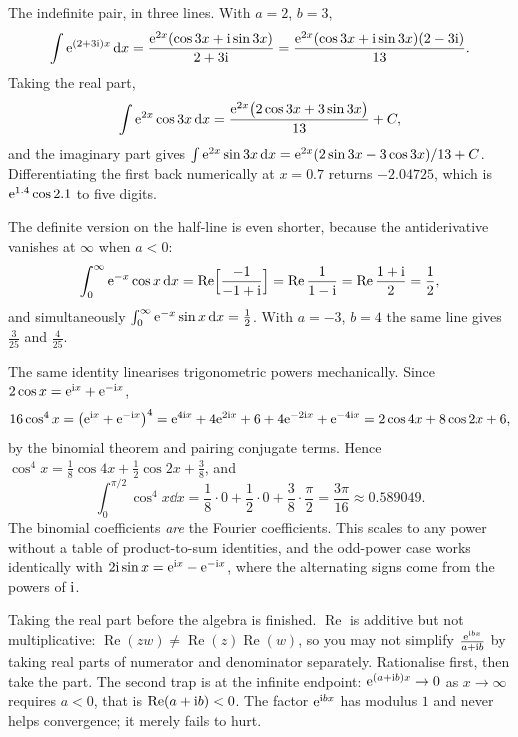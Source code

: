 \begin{worked}
The indefinite pair, in three lines. With $a=2$, $b=3$,
\[\int\mathrm{e}^{(2+3\mathrm{i})x}\,\mathrm{d} x=\frac{\mathrm{e}^{2x}(\cos3x+\mathrm{i}\sin3x)}{2+3\mathrm{i}}=\frac{\mathrm{e}^{2x}(\cos3x+\mathrm{i}\sin3x)(2-3\mathrm{i})}{13}.\]
Taking the real part,
\[\int\mathrm{e}^{2x}\cos3x\,\mathrm{d} x=\frac{\mathrm{e}^{2x}\bigl(2\cos3x+3\sin3x\bigr)}{13}+C,\]
and the imaginary part gives $\int\mathrm{e}^{2x}\sin3x\,\mathrm{d} x=\mathrm{e}^{2x}(2\sin3x-3\cos3x)/13+C$. Differentiating the first back numerically at $x=0.7$ returns $-2.04725$, which is $\mathrm{e}^{1.4}\cos2.1$ to five digits.

The definite version on the half-line is even shorter, because the antiderivative vanishes at $\infty$ when $a<0$:
\[\int_0^{\infty}\mathrm{e}^{-x}\cos x\,\mathrm{d} x=\operatorname{Re}\Bigl[\frac{-1}{-1+\mathrm{i}}\Bigr]=\operatorname{Re}\frac{1}{1-\mathrm{i}}=\operatorname{Re}\frac{1+\mathrm{i}}{2}=\frac12,\]
and simultaneously $\int_0^{\infty}\mathrm{e}^{-x}\sin x\,\mathrm{d} x=\tfrac12$. With $a=-3$, $b=4$ the same line gives $\tfrac{3}{25}$ and $\tfrac{4}{25}$.
\end{worked}

\begin{worked}
The same identity linearises trigonometric powers mechanically. Since $2\cos x=\mathrm{e}^{\mathrm{i} x}+\mathrm{e}^{-\mathrm{i} x}$,
\[16\cos^{4}x=\bigl(\mathrm{e}^{\mathrm{i} x}+\mathrm{e}^{-\mathrm{i} x}\bigr)^{4}=\mathrm{e}^{4\mathrm{i} x}+4\mathrm{e}^{2\mathrm{i} x}+6+4\mathrm{e}^{-2\mathrm{i} x}+\mathrm{e}^{-4\mathrm{i} x}
=2\cos4x+8\cos2x+6,\]
by the binomial theorem and pairing conjugate terms. Hence $\cos^{4}x=\tfrac18\cos4x+\tfrac12\cos2x+\tfrac38$, and
\[\int_0^{\pi/2}\cos^{4}x\dd x=\frac18\cdot0+\frac12\cdot0+\frac38\cdot\frac{\pi}{2}=\frac{3\pi}{16}\approx0.589049.\]
The binomial coefficients \emph{are} the Fourier coefficients. This scales to any power without a table of product-to-sum identities, and the odd-power case works identically with $2\mathrm{i}\sin x=\mathrm{e}^{\mathrm{i} x}-\mathrm{e}^{-\mathrm{i} x}$, where the alternating signs come from the powers of $\mathrm{i}$.
\end{worked}

\begin{trap}
Taking the real part before the algebra is finished. $\operatorname{Re}$ is additive but not multiplicative: $\operatorname{Re}(zw)\neq\operatorname{Re}(z)\operatorname{Re}(w)$, so you may not simplify $\frac{\mathrm{e}^{\mathrm{i} bx}}{a+\mathrm{i} b}$ by taking real parts of numerator and denominator separately. Rationalise first, then take the part. The second trap is at the infinite endpoint: $\mathrm{e}^{(a+\mathrm{i} b)x}\to0$ as $x\to\infty$ requires $a<0$, that is $\operatorname{Re}(a+\mathrm{i} b)<0$. The factor $\mathrm{e}^{\mathrm{i} bx}$ has modulus $1$ and never helps convergence; it merely fails to hurt.
\end{trap}

